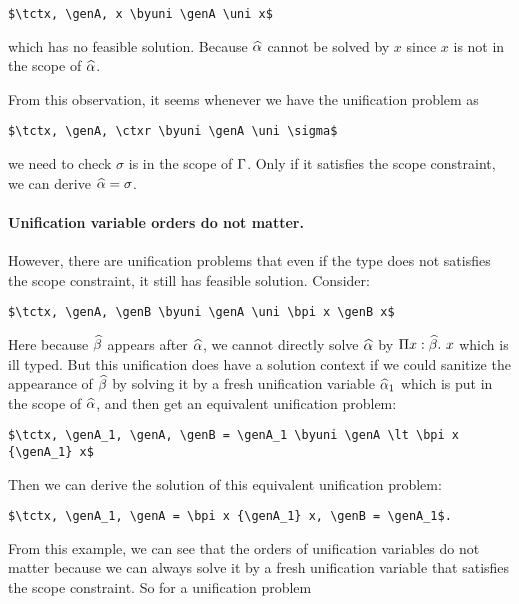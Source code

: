 \begin{lstlisting}
$\tctx, \genA, x \byuni \genA \uni x$
\end{lstlisting}

\noindent which has no feasible solution. Because $\widehat{\alpha}$ cannot be solved by
$x$ since $x$ is not in the scope of $\widehat{\alpha}$.

From this observation, it seems whenever we have the unification problem as

\begin{lstlisting}
$\tctx, \genA, \ctxr \byuni \genA \uni \sigma$
\end{lstlisting}

\noindent we need to check $\sigma$ is in the scope of $\Gamma$. Only if it
satisfies the scope constraint, we can derive $\widehat{\alpha} = \sigma$.

\paragraph{Unification variable orders do not matter.}

However, there are unification problems that even if the type does not satisfies the
scope constraint, it still has feasible solution. Consider:

\begin{lstlisting}
$\tctx, \genA, \genB \byuni \genA \uni \bpi x \genB x$
\end{lstlisting}

Here because $\widehat{\beta}$ appears after $\widehat{\alpha}$, we cannot directly solve $\widehat{\alpha}$
by $\Pi x:\widehat{\beta}.~ x$ which is ill typed.
But this unification does have a solution context if we could sanitize the
appearance of $\widehat{\beta}$ by solving it by a fresh unification variable $\widehat{\alpha}_1$
which is put in the scope of $\widehat{\alpha}$, and then
get an equivalent unification problem:

\begin{lstlisting}
$\tctx, \genA_1, \genA, \genB = \genA_1 \byuni \genA \lt \bpi x {\genA_1} x$
\end{lstlisting}

\noindent Then we can derive the solution of this equivalent unification problem:

\begin{lstlisting}
$\tctx, \genA_1, \genA = \bpi x {\genA_1} x, \genB = \genA_1$.
\end{lstlisting}

From this example, we can see that the orders of unification variables do not
matter because we can always solve it by a fresh unification variable that
satisfies the scope constraint. So for a unification problem

